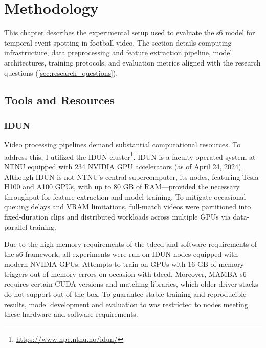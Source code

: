 \chapter{Methodology} 
\label{chap:methodology}
This chapter describes the experimental setup used to evaluate the \acrfull{s6} model for temporal event spotting in football video. The section details computing infrastructure, data preprocessing and feature extraction pipeline, model architectures, training protocols, and evaluation metrics aligned with the research questions (\autoref{sec:research_questions}).


\section{Tools and Resources}
\label{sec:tools_and_resources}

\subsection{IDUN}
\label{ssec:idun}
Video processing pipelines demand substantial computational resources. To address this, I utilized the IDUN cluster\footnote{\url{https://www.hpc.ntnu.no/idun/}}. IDUN is a faculty-operated system at NTNU equipped with 234 NVIDIA GPU accelerators (as of April 24, 2024). Although IDUN is not NTNU’s central supercomputer, its nodes, featuring Tesla H100 and A100 GPUs, with up to 80 GB of RAM—provided the necessary throughput for feature extraction and model training. To mitigate occasional queuing delays and VRAM limitations, full-match videos were partitioned into fixed-duration clips and distributed workloads across multiple GPUs via data-parallel training.

Due to the high memory requirements of the \acrlong{tdeed} and software requirements of the \acrlong{s6} framework, all experiments were run on IDUN nodes equipped with modern NVIDIA GPUs. Attempts to train on GPUs with 16 GB of memory triggers out-of-memory errors on occasion with \acrshort{tdeed}. Moreover, MAMBA \acrshort{s6} requires certain CUDA versions and matching libraries, which older driver stacks do not support out of the box. To guarantee stable training and reproducible results, model development and evaluation to was restricted to nodes meeting these hardware and software requirements. 

